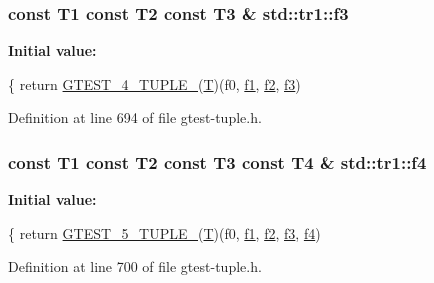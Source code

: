 \subsubsection[{\texorpdfstring{f3}{f3}}]{\setlength{\rightskip}{0pt plus 5cm}const T1 const T2 const T3 \& std\+::tr1\+::f3}\hypertarget{namespacestd_1_1tr1_a0f7c3b47d27d42d82d1a333ea420ce4e}{}\label{namespacestd_1_1tr1_a0f7c3b47d27d42d82d1a333ea420ce4e}
{\bfseries Initial value\+:}
\begin{DoxyCode}
\{
  \textcolor{keywordflow}{return} \hyperlink{gtest-tuple_8h_a3625feb24d5e6eb9926fd558e4a2e3ff}{GTEST\_4\_TUPLE\_}(\hyperlink{all__17_8js_adf1f3edb9115acb0a1e04209b7a9937b}{T})(f0, \hyperlink{namespacestd_1_1tr1_a9c0fa65b105f8e2f58ba59ecf75fd000}{f1}, \hyperlink{namespacestd_1_1tr1_a87dd9e009868361317f587126dba63d4}{f2}, \hyperlink{namespacestd_1_1tr1_a0f7c3b47d27d42d82d1a333ea420ce4e}{f3})
\end{DoxyCode}


Definition at line 694 of file gtest-\/tuple.\+h.

\subsubsection[{\texorpdfstring{f4}{f4}}]{\setlength{\rightskip}{0pt plus 5cm}const T1 const T2 const T3 const T4 \& std\+::tr1\+::f4}\hypertarget{namespacestd_1_1tr1_adc796e02b7385d526aff708189564f67}{}\label{namespacestd_1_1tr1_adc796e02b7385d526aff708189564f67}
{\bfseries Initial value\+:}
\begin{DoxyCode}
\{
  \textcolor{keywordflow}{return} \hyperlink{gtest-tuple_8h_a64e6f4a4cf55f62cde94066c6d5d5c74}{GTEST\_5\_TUPLE\_}(\hyperlink{all__17_8js_adf1f3edb9115acb0a1e04209b7a9937b}{T})(f0, \hyperlink{namespacestd_1_1tr1_a9c0fa65b105f8e2f58ba59ecf75fd000}{f1}, \hyperlink{namespacestd_1_1tr1_a87dd9e009868361317f587126dba63d4}{f2}, \hyperlink{namespacestd_1_1tr1_a0f7c3b47d27d42d82d1a333ea420ce4e}{f3}, \hyperlink{namespacestd_1_1tr1_adc796e02b7385d526aff708189564f67}{f4})
\end{DoxyCode}


Definition at line 700 of file gtest-\/tuple.\+h.

